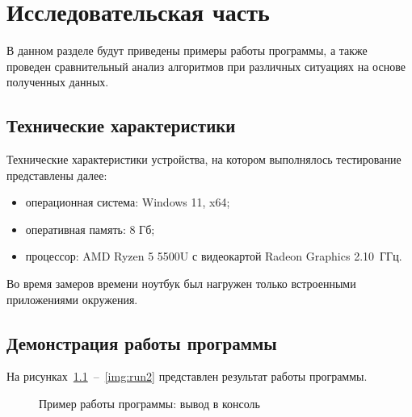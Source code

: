 \chapter{Исследовательская часть}

В данном разделе будут приведены примеры работы программы, а также проведен сравнительный анализ алгоритмов при различных ситуациях на основе полученных данных.

\section{Технические характеристики}

Технические характеристики устройства, на котором выполнялось тестирование представлены далее:
\begin{itemize}[label={---}]
	\item операционная система: Windows 11, x64;
	\item оперативная память: 8 Гб;
	\item процессор: AMD Ryzen 5 5500U с видеокартой Radeon Graphics 2.10~ГГц.
\end{itemize}

Во время замеров времени ноутбук был нагружен только встроенными приложениями окружения.

\section{Демонстрация работы программы}

На рисунках~\ref{img:run1}~--~\ref{img:run2} представлен результат работы программы.

\begin{figure}[H]
	\caption{Пример работы программы: вывод в консоль}
	\label{img:run1}
\end{figure}

